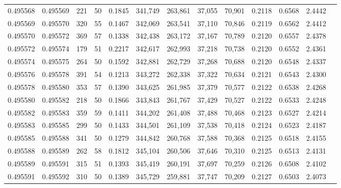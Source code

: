 \begin{tabular}{rrrrrrrrrrrrr}
0.495568 & 0.495569 &   221 &  50 &                                     0.1845 & 341,749 & 263,861 &  37,055 &  70,901 & 0.2118 & 0.6568 & 2.4442 \\
0.495569 & 0.495570 &   320 &  55 &                                     0.1467 & 342,069 & 263,541 &  37,110 &  70,846 & 0.2119 & 0.6562 & 2.4412 \\
0.495570 & 0.495572 &   369 &  57 &                                     0.1338 & 342,438 & 263,172 &  37,167 &  70,789 & 0.2120 & 0.6557 & 2.4378 \\
0.495572 & 0.495574 &   179 &  51 &                                     0.2217 & 342,617 & 262,993 &  37,218 &  70,738 & 0.2120 & 0.6552 & 2.4361 \\
0.495574 & 0.495575 &   264 &  50 &                                     0.1592 & 342,881 & 262,729 &  37,268 &  70,688 & 0.2120 & 0.6548 & 2.4337 \\
0.495576 & 0.495578 &   391 &  54 &                                     0.1213 & 343,272 & 262,338 &  37,322 &  70,634 & 0.2121 & 0.6543 & 2.4300 \\
0.495578 & 0.495580 &   353 &  57 &                                     0.1390 & 343,625 & 261,985 &  37,379 &  70,577 & 0.2122 & 0.6538 & 2.4268 \\
0.495580 & 0.495582 &   218 &  50 &                                     0.1866 & 343,843 & 261,767 &  37,429 &  70,527 & 0.2122 & 0.6533 & 2.4248 \\
0.495582 & 0.495583 &   359 &  59 &                                     0.1411 & 344,202 & 261,408 &  37,488 &  70,468 & 0.2123 & 0.6527 & 2.4214 \\
0.495583 & 0.495585 &   299 &  50 &                                     0.1433 & 344,501 & 261,109 &  37,538 &  70,418 & 0.2124 & 0.6523 & 2.4187 \\
0.495585 & 0.495588 &   341 &  50 &                                     0.1279 & 344,842 & 260,768 &  37,588 &  70,368 & 0.2125 & 0.6518 & 2.4155 \\
0.495588 & 0.495589 &   262 &  58 &                                     0.1812 & 345,104 & 260,506 &  37,646 &  70,310 & 0.2125 & 0.6513 & 2.4131 \\
0.495589 & 0.495591 &   315 &  51 &                                     0.1393 & 345,419 & 260,191 &  37,697 &  70,259 & 0.2126 & 0.6508 & 2.4102 \\
0.495591 & 0.495592 &   310 &  50 &                                     0.1389 & 345,729 & 259,881 &  37,747 &  70,209 & 0.2127 & 0.6503 & 2.4073 \\

\end{tabular}
